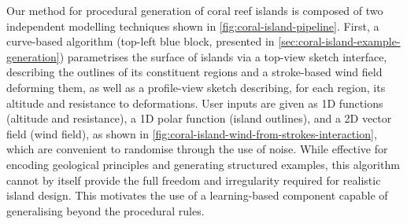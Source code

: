 






Our method for procedural generation of coral reef islands is composed of two independent modelling techniques shown in \cref{fig:coral-island-pipeline}. First, a curve-based algorithm (top-left blue block, presented in \cref{sec:coral-island-example-generation}) parametrises the surface of islands via a top-view sketch interface, describing the outlines of its constituent regions and a stroke-based wind field deforming them, as well as a profile-view sketch describing, for each region, its altitude and resistance to deformations. User inputs are given as 1D functions (altitude and resistance), a 1D polar function (island outlines), and a 2D vector field (wind field), as shown in \cref{fig:coral-island-wind-from-strokes-interaction}, which are convenient to randomise through the use of noise. While effective for encoding geological principles and generating structured examples, this algorithm cannot by itself provide the full freedom and irregularity required for realistic island design. This motivates the use of a learning-based component capable of generalising beyond the procedural rules.

